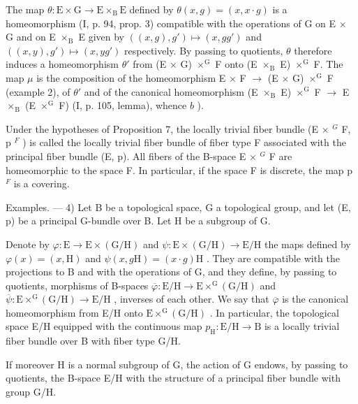 The map \(\theta\colon\mathrm{E}\times\mathrm{G}\to\mathrm{E}\times_{\mathrm{B}}\mathrm{E}\) defined by \(\theta(x,g)=(x,x\cdot g)\) is a homeomorphism (I, p. 94, prop. 3) compatible with the operations of G on E \(\times\) G and on E \(\times_{\mathrm{B}}\) E given by \(((x,g),g')\mapsto(x,gg')\) and \(((x,y),g')\mapsto(x,yg')\) respectively. By passing to quotients, \(\theta\) therefore induces a homeomorphism \(\theta'\) from (E \(\times\) G) \(\times^{\mathrm{G}}\) F onto (E \(\times_{\mathrm{B}}\) E) \(\times^{\mathrm{G}}\) F. The map \(\mu\) is the composition of the homeomorphism E \(\times\) F \(\rightarrow\) (E \(\times\) G) \(\times^{\mathrm{G}}\) F (example 2), of \(\theta'\) and of the canonical homeomorphism (E \(\times_{\mathrm{B}}\) E) \(\times^{\mathrm{G}}\) F \(\rightarrow\) E \(\times_{\mathrm{B}}\) (E \(\times^{\mathrm{G}}\) F) (I, p. 105, lemma), whence \(b\) ).

Under the hypotheses of Proposition 7, the locally trivial fiber bundle (E × \(^{G}\) F, p \(^{F}\) ) is called the locally trivial fiber bundle of fiber type F associated with the principal fiber bundle (E, p). All fibers of the B-space E × \(^{G}\) F are homeomorphic to the space F. In particular, if the space F is discrete, the map p \(^{F}\) is a covering.

Examples. --- 4) Let B be a topological space, G a topological group, and let (E, p) be a principal G-bundle over B. Let H be a subgroup of G.

Denote by \(\varphi\colon\mathrm{E}\to\mathrm{E}\times(\mathrm{G}/\mathrm{H})\) and \(\psi\colon\mathrm{E}\times(\mathrm{G}/\mathrm{H})\to\mathrm{E}/\mathrm{H}\) the maps defined by \(\varphi(x)=(x,\mathrm{H})\) and \(\psi(x,g\mathrm{H})=(x\cdot g)\mathrm{H}\) . They are compatible with the projections to B and with the operations of G, and they define, by passing to quotients, morphisms of B-spaces \(\overline{\varphi}\colon\mathrm{E}/\mathrm{H}\to\mathrm{E}\times^{\mathrm{G}}(\mathrm{G}/\mathrm{H})\) and \(\overline{\psi}\colon\mathrm{E}\times^{\mathrm{G}}(\mathrm{G}/\mathrm{H})\to\mathrm{E}/\mathrm{H}\) , inverses of each other. We say that \(\overline{\varphi}\) is the canonical homeomorphism from E/H onto \(\mathrm{E}\times^{\mathrm{G}}(\mathrm{G}/\mathrm{H})\) . In particular, the topological space E/H equipped with the continuous map \(p_{\mathrm{H}}\colon\mathrm{E}/\mathrm{H}\to\mathrm{B}\) is a locally trivial fiber bundle over B with fiber type G/H.

If moreover H is a normal subgroup of G, the action of G endows, by passing to quotients, the B-space E/H with the structure of a principal fiber bundle with group G/H.

